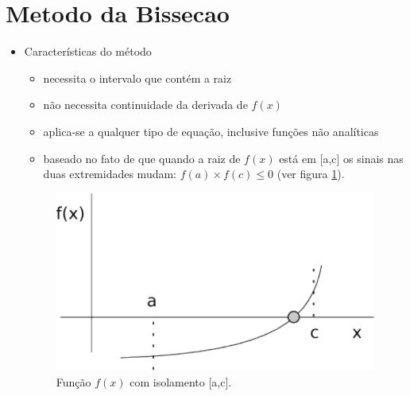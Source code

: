 \section{Metodo da Bissecao}

\begin{itemize}

\item Características do método
 \begin{itemize}
  \item necessita o intervalo que contém a raiz
  \item não necessita continuidade da derivada de $f(x)$
  \item aplica-se a qualquer tipo de equação, inclusive funções não analíticas
  \item baseado no fato de que quando a raiz de $f(x)$ está em [a,c] os sinais nas duas extremidades mudam: $f(a) \times f(c) \leq 0$ (ver figura \ref{fig:bissecao1}).
 \end{itemize}

\begin{figure}[htb]
  \setlength{\abovecaptionskip}{20pt}
  \centering
  \includegraphics[scale=0.5]{capitulos/capitulo1/figuras/bissecao1.pdf}
  \caption{Função $f(x)$ com isolamento [a,c].}
  \label{fig:bissecao1}
\end{figure}

\end{itemize}

